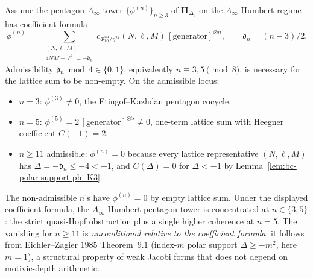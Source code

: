 \begin{theorem}
\label{thm:bc-polar-depth-reduction}
\ClaimStatusConditional
Assume the pentagon $A_\infty$-tower $\{\phi^{(n)}\}_{n\ge 3}$ of
$\mathbf{H}_{\Delta_5}$ on the $A_\infty$-Humbert regime has coefficient
formula
\[
 \phi^{(n)} \;=\; \sum_{\substack{(N, \ell, M)\\ 4NM - \ell^2 = -\mathfrak d_n}}
 c_{\Phi_{10}^{\mathrm{un}}/\eta^{24}}(N, \ell, M)\,
 [\mathrm{generator}]^{\otimes n},
 \qquad \mathfrak d_n = (n-3)/2.
\]
Admissibility $\mathfrak d_n \bmod 4 \in \{0, 1\}$, equivalently
$n \equiv 3, 5 \pmod 8$, is necessary for the lattice sum to be
non-empty. On the admissible locus:
\begin{itemize}
\item $n = 3$: $\phi^{(3)} \ne 0$, the Etingof--Kazhdan pentagon
 cocycle.
\item $n = 5$: $\phi^{(5)} = 2\,[\mathrm{generator}]^{\otimes 5} \ne 0$,
 one-term lattice sum with Heegner coefficient
 $C(-1) = 2$.
\item $n \ge 11$ admissible: $\phi^{(n)} = 0$ because every lattice
 representative $(N, \ell, M)$ has $\Delta = -\mathfrak d_n \le -4 < -1$, and
 $C(\Delta) = 0$ for $\Delta < -1$ by
 Lemma~\ref{lem:bc-polar-support-phi-K3}.
\end{itemize}
The non-admissible $n$'s have $\phi^{(n)} = 0$ by empty lattice sum.
Under the displayed coefficient formula, the $A_\infty$-Humbert
pentagon tower is concentrated at
$n \in \{3, 5\}$: the strict quasi-Hopf obstruction plus a single
higher coherence at $n = 5$. The vanishing for $n \ge 11$ is
\emph{unconditional relative to the coefficient formula}: it follows
from Eichler--Zagier $1985$ Theorem~$9.1$
(index-$m$ polar support $\Delta \ge -m^2$, here $m = 1$), a
structural property of weak Jacobi forms that does not depend on
motivic-depth arithmetic.
\end{theorem}

